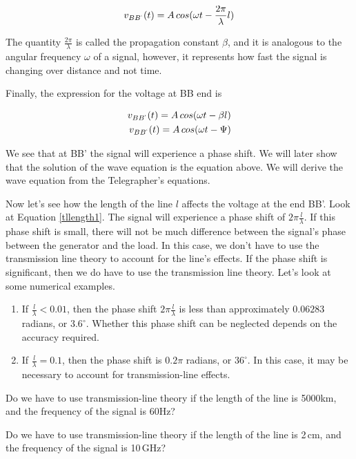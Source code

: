 \documentclass{ximera}
\begin{document}
\begin{eqnarray}
v_{BB^`}(t) = A \, cos(\omega t -  \frac{ 2 \pi }{\lambda} l) %
\end{eqnarray}

The quantity $ \frac{ 2 \pi }{\lambda} $ is called the propagation constant $\beta$, and it is analogous to the angular frequency $\omega$ of a signal, however, it represents how fast the signal is changing over distance and not time.


Finally, the expression for the voltage at BB end is


\begin{eqnarray}
v_{BB^`}(t)=A \, cos(\omega t - \beta l) \\
v_{BB^`}(t)=A \, cos(\omega t - \Psi)
\end{eqnarray}

We see that at BB' the signal will experience a phase shift.
We will later show that the solution of the wave equation is the equation above. We will derive the wave equation   from the Telegrapher's
equations.

Now let's see how the length of the line $l$ affects the voltage at the
end BB'. Look at Equation \ref{tllength1}.
The signal will experience a phase shift of $2\pi \frac{l}{\lambda}$. If this phase shift is small, there will not be much difference between
the signal's phase between the generator and the load. In this case, we don't have to use the transmission line theory to account for the line's effects.
If the phase shift is significant, then we do have to use the transmission line theory. Let's look at some numerical examples.

\begin{enumerate}
\item If $\frac{l}{\lambda}<0.01$, then the phase shift
$2\pi\frac{l}{\lambda}$ is less than approximately
$0.06283$ radians, or $3.6^\circ$.
Whether this phase shift can be neglected depends on
the accuracy required.
\item If $\frac{l}{\lambda}=0.1$, then the phase shift
is $0.2\pi$ radians, or $36^\circ$.
In this case, it may be necessary to account for
transmission-line effects.
\end{enumerate}


\begin{question}  
Do we have to use transmission-line theory if the length of the line is 5000km, and the frequency of the signal is 60Hz? 
\begin{multipleChoice}  
\end{multipleChoice}  
\end{question} 



\begin{question}  
Do we have to use transmission-line theory if the length of the line is 2\,cm, and the frequency of the signal is 10\,GHz? 
\begin{multipleChoice}  
\end{multipleChoice}  
\end{question} 
\end{document}
